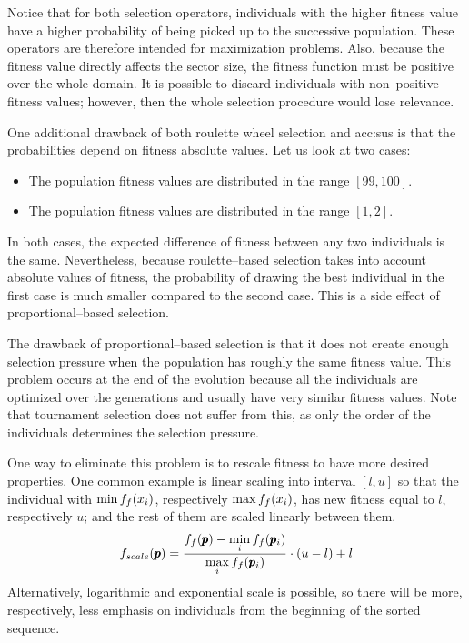 Notice that for both selection operators, individuals with the higher fitness value have a higher probability of being picked up to the successive population. These operators are therefore intended for maximization problems. Also, because the fitness value directly affects the sector size, the fitness function must be positive over the whole domain. It is possible to discard individuals with non--positive fitness values; however, then the whole selection procedure would lose relevance.

One additional drawback of both roulette wheel selection and \acrshort{acc:sus} is that the probabilities depend on fitness absolute values. Let us look at two cases:
\begin{itemize}
    \item The population fitness values are distributed in the range $\left[ 99,100 \right]$.
    \item The population fitness values are distributed in the range $\left[ 1, 2\right]$.
\end{itemize}
In both cases, the expected difference of fitness between any two individuals is the same. Nevertheless, because roulette--based selection takes into account absolute values of fitness, the probability of drawing the best individual in the first case is much smaller compared to the second case. This is a side effect of proportional--based selection.

The drawback of proportional--based selection is that it does not create enough selection pressure when the population has roughly the same fitness value. This problem occurs at the end of the evolution because all the individuals are optimized over the generations and usually have very similar fitness values. Note that tournament selection does not suffer from this, as only the order of the individuals determines the selection pressure.

One way to eliminate this problem is to rescale fitness to have more desired properties. One common example is linear scaling into interval $\left[ l,u \right]$ so that the individual with $\min f_f(x_i)$, respectively $\max f_f(x_i)$, has new fitness equal to $l$, respectively $u$; and the rest of them are scaled linearly between them. 
$$
f_{scale}(\pmb{p})=\frac{f_f(\pmb{p}) - \min\limits_{i}f_f(\pmb{p}_i)}{\max\limits_{i}f_f(\pmb{p}_i)}\cdot(u-l)+l 
$$
Alternatively, logarithmic and exponential scale is possible, so there will be more, respectively, less emphasis on individuals from the beginning of the sorted sequence.

